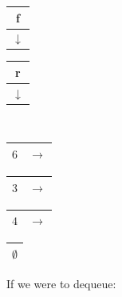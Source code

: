 \documentclass[nobib]{tufte-handout}
\begin{document}
\begin{table}
    \centering
    \begin{tabular}{|c|}
        \hline
        f            \\
        \hline
        $\downarrow$ \\
        \hline
    \end{tabular}
    \hspace{6.3em}
    \begin{tabular}{|c|}
        \hline
        r            \\
        \hline
        $\downarrow$ \\
        \hline
    \end{tabular}
    \hspace{3.5em} \quad \hspace{1em}
    \\
    \begin{tabular}{|c|c|}
        \hline
        $6$ & $\rightarrow$ \\
        \hline
    \end{tabular}
    \begin{tabular}{|c|c|}
        \hline
        $3$ & $\rightarrow$ \\
        \hline
    \end{tabular}
    \begin{tabular}{|c|c|}
        \hline
        $4$ & $\rightarrow$ \\
        \hline
    \end{tabular}
    \begin{tabular}{|c|}
        \hline
        $\emptyset$ \\
        \hline
    \end{tabular}
\end{table}
If we were to dequeue:\\
\end{document}
